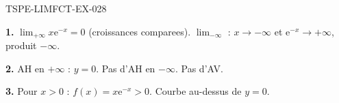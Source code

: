 \begin{corrige}{TSPE-LIMFCT-EX-028}

\textbf{1.} $\lim_{+\infty} x\mathrm{e}^{-x} = \boxed{0}$ (croissances comparees). $\lim_{-\infty}$ : $x \to -\infty$ et $\mathrm{e}^{-x} \to +\infty$, produit $\boxed{-\infty}$.

\textbf{2.} AH en $+\infty$ : $y = 0$. Pas d'AH en $-\infty$. Pas d'AV.

\textbf{3.} Pour $x > 0$ : $f(x) = x\mathrm{e}^{-x} > 0$. Courbe au-dessus de $y = 0$.

\end{corrige}
